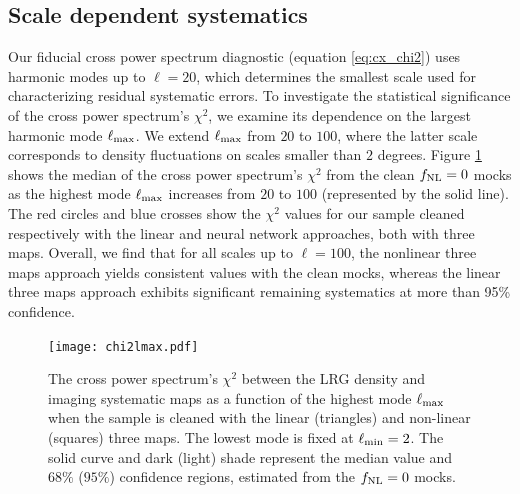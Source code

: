 \subsection{Scale dependent systematics}\label{sec:scalesys}
Our fiducial cross power spectrum diagnostic (equation \ref{eq:cx_chi2}) uses harmonic modes up to $\ell=20$, which determines the smallest scale used for characterizing residual systematic errors. To investigate the statistical significance of the cross power spectrum's $\chi^{2}$, we examine its dependence on the largest harmonic mode $\ell_{\rm max}$. We extend $\ell_{\rm max}$ from $20$ to $100$, where the latter scale corresponds to density fluctuations on scales smaller than $2$ degrees. Figure \ref{fig:chi2cellextend} shows the median of the cross power spectrum's $\chi^{2}$ from the clean $f_{\rm NL}=0$ mocks as the highest mode $\ell_{\rm max}$ increases from $20$ to $100$ (represented by the solid line). The red circles and blue crosses show the $\chi^{2}$ values for our sample cleaned respectively with the linear and neural network approaches, both with three maps. Overall, we find that for all scales up to $\ell=100$, the nonlinear three maps approach yields consistent values with the clean mocks, whereas the linear three maps approach exhibits significant remaining systematics at more than 95\% confidence.

\begin{figure}
\centering
\texttt{[image: chi2lmax.pdf]}
\caption{The cross power spectrum's $\chi^{2}$ between the LRG density and imaging systematic maps as a function of the highest mode $\ell_{\rm max}$ when the sample is cleaned with the linear (triangles) and non-linear (squares) three maps. The lowest mode is fixed at $\ell_{\rm min}=2$. The solid curve and dark (light) shade represent the median value and $68\%$ ($95\%$) confidence regions, estimated from the $f_{\rm NL}=0$ mocks.}\label{fig:chi2cellextend}
\end{figure}


